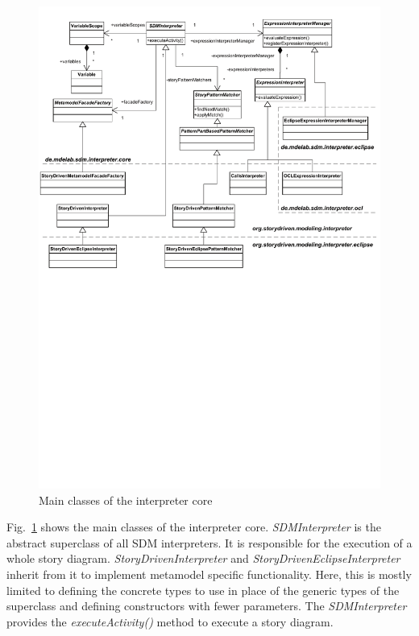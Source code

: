 \begin{figure}[htb]
  \centering
  \includegraphics[width=1.0\columnwidth]{./figures/interpreter_core.pdf}
  \caption{Main classes of the interpreter core}
  \label{fig:sdm_interpreter}
\end{figure}

Fig.~\ref{fig:sdm_interpreter} shows the main classes of the interpreter core. \emph{SDMInterpreter} is the abstract superclass of all SDM interpreters. It is responsible for the execution of a whole story diagram. \emph{StoryDrivenInterpreter} and \emph{StoryDrivenEclipseInterpreter} inherit from it to implement metamodel specific functionality. Here, this is mostly limited to defining the concrete types to use in place of the generic types of the superclass and defining constructors with fewer parameters. The \emph{SDMInterpreter} provides the \emph{executeActivity()} method to execute a story diagram.

